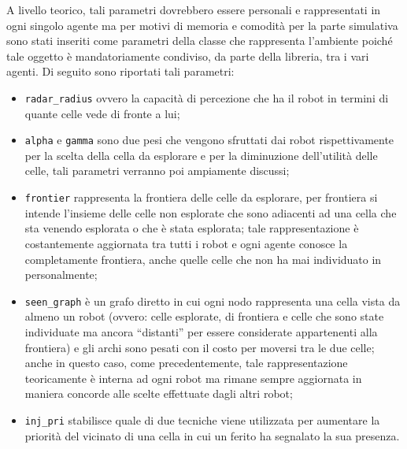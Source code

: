 A livello teorico, tali parametri dovrebbero essere personali e rappresentati in ogni singolo agente ma per motivi di memoria e comodità per la parte simulativa sono stati inseriti come parametri della classe che rappresenta l'ambiente poiché tale oggetto è mandatoriamente condiviso, da parte della libreria, tra i vari agenti.
Di seguito sono riportati tali parametri:
\begin{itemize}
	\item \texttt{radar\_radius} ovvero la capacità di percezione che ha il robot in termini di quante celle vede di fronte a lui;
	\item \texttt{alpha} e \texttt{gamma} sono due pesi che vengono sfruttati dai robot rispettivamente per la scelta della cella da esplorare e per la diminuzione dell'utilità delle celle, tali parametri verranno poi ampiamente discussi;
	\item \texttt{frontier} rappresenta la frontiera delle celle da esplorare, per frontiera si intende l'insieme delle celle non esplorate che sono adiacenti ad una cella che sta venendo esplorata o che è stata esplorata; tale rappresentazione è costantemente aggiornata tra tutti i robot e ogni agente conosce la completamente frontiera, anche quelle celle che non ha mai individuato in personalmente;
	\item \texttt{seen\_graph} è un grafo diretto in cui ogni nodo rappresenta una cella vista da almeno un robot (ovvero: celle esplorate, di frontiera e celle che sono state individuate ma ancora “distanti” per essere considerate appartenenti alla frontiera) e gli archi sono pesati con il costo per moversi tra le due celle; anche in questo caso, come precedentemente, tale rappresentazione teoricamente è interna ad ogni robot ma rimane sempre aggiornata in maniera concorde alle scelte effettuate dagli altri robot;
	\item \texttt{inj\_pri} stabilisce quale di due tecniche viene utilizzata per aumentare la priorità del vicinato di una cella in cui un ferito ha segnalato la sua presenza.
\end{itemize}